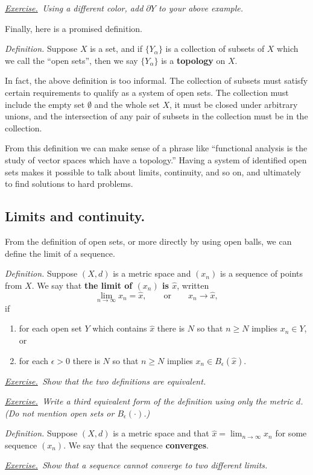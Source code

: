 \documentclass[12pt]{article}
\newcommand{\eps}{\epsilon}
\newcommand{\sect}[1]{\subsection*{#1.}}
\newcommand{\defin}{\emph{Definition.}\,\,}
\newcommand{\exer}[2]{\emph{\underline{Exercise.}\, #2} \vspace*{#1mm}}
\begin{document}
\exer{1}{Using a different color, add $\partial Y$ to your above example.}

Finally, here is a promised definition.

\defin Suppose $X$ is a set, and if $\{Y_\alpha\}$ is a collection of subsets of $X$ which we call the ``open sets'', then we say $\{Y_\alpha\}$ is a \textbf{topology} on $X$.

In fact, the above definition is too informal.  The collection of subsets must satisfy certain requirements to qualify as a system of open sets.  The collection must include the empty set $\emptyset$ and the whole set $X$, it must be closed under arbitrary unions, and the intersection of any pair of subsets in the collection must be in the collection.

From this definition we can make sense of a phrase like ``functional analysis is the study of vector spaces which have a topology.''  Having a system of identified open sets makes it possible to talk about limits, continuity, and so on, and ultimately to find solutions to hard problems.


\sect{Limits and continuity}

From the definition of open sets, or more directly by using open balls, we can define the limit of a sequence.

\defin Suppose $(X,d)$ is a metric space and $(x_n)$ is a sequence of points from $X$.  We say that \textbf{the limit of $(x_n)$ is $\hat x$}, written
	$$\lim_{n\to\infty} x_n = \hat x, \qquad \text{or} \qquad x_n \to \hat x,$$
if
\begin{enumerate}
\item for each open set $Y$ which contains $\hat x$ there is $N$ so that $n\ge N$ implies $x_n \in Y$, or
\item for each $\eps>0$ there is $N$ so that $n\ge N$ implies $x_n \in B_\eps(\hat x)$.
\end{enumerate}

\exer{40}{Show that the two definitions are equivalent.}

\exer{30}{Write a third equivalent form of the definition using only the metric $d$.  (Do not mention open sets or $B_\eps(\cdot)$.)}

\defin Suppose $(X,d)$ is a metric space and that $\hat x = \lim_{n\to\infty} x_n$ for some sequence $(x_n)$.  We say that the sequence \textbf{converges}.

\exer{40}{Show that a sequence cannot converge to two different limits.}
\end{document}
